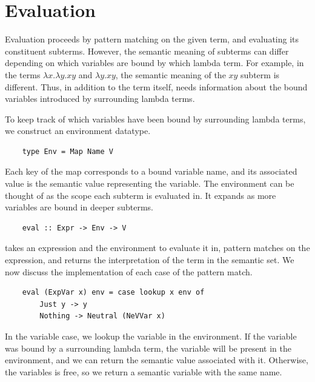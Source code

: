
\section{Evaluation}

Evaluation proceeds by pattern matching on the given term, and evaluating its constituent subterms. However, the semantic meaning of subterms can differ depending on which variables are bound by which lambda term. For example, in the terms $\lambda x . \lambda y . xy$ and $\lambda y . xy$, the semantic meaning of the $xy$ subterm is different. Thus, in addition to the term itself,  needs information about the bound variables introduced by surrounding lambda terms. 

To keep track of which variables have been bound by surrounding lambda terms, we construct an environment datatype.

\begin{lstlisting}
    type Env = Map Name V
\end{lstlisting}

Each key of the map corresponds to a bound variable name, and its associated value is the semantic value representing the variable. The environment can be thought of as the scope each subterm is evaluated in. 
It expands as more variables are bound in deeper subterms.

\begin{lstlisting}
    eval :: Expr -> Env -> V
\end{lstlisting}

 takes an expression and the environment to evaluate it in, pattern matches on the expression, and returns the interpretation of the term in the semantic set. We now discuss the implementation of each case of the pattern match.

\begin{lstlisting}
    eval (ExpVar x) env = case lookup x env of
        Just y -> y
        Nothing -> Neutral (NeVVar x)
\end{lstlisting}

In the variable case, we lookup the variable in the environment. If the variable was bound by a surrounding lambda term, the variable will be present in the environment, and we can return the semantic value associated with it. Otherwise, the variables is free, so we return a semantic variable with the same name.

